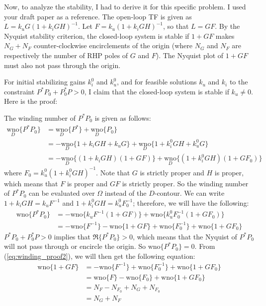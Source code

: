 \documentclass[12pt]{article}
\begin{document}
Now, to analyze the stability, I had to derive it for this specific problem. I used your draft paper as a reference. The open-loop TF is given as $L = k_uG(1+k_iGH)^{-1}$. Let $F = k_u(1+k_iGH)^{-1}$, so that $L = GF$. By the Nyquist stability criterion, the closed-loop system is stable if $1+GF$ makes $N_G+N_F$ counter-clockwise encirclements of the origin (where $N_G$ and $N_F$ are respectively the number of RHP poles of $G$ and $F$). The Nyquist plot of $1+GF$ must also not pass through the origin.

For initial stabilizing gains $k_i^0$ and $k_u^0$, and for feasible solutions $k_u$ and $k_i$ to the constraint $P^*P_0+P_0^*P > 0$, I claim that the closed-loop system is stable if $k_u \neq 0$. Here is the proof:

The winding number of $P^*P_0$ is given as follows:
\begin{equation} \label{eq:winding_proof}
\begin{aligned}
\underset{D}{\mbox{wno}} \{ P^*P_0\} &= \underset{D}{\mbox{wno}} \{ P^*\} + \underset{D}{\mbox{wno}} \{ P_0\} \\
&= -\underset{D}{\mbox{wno}} \{ 1+k_iGH+k_uG\} + \underset{D}{\mbox{wno}} \{ 1+k_i^0GH+k_u^0G\} \\
&=-\underset{D}{\mbox{wno}} \{ (1+k_iGH)(1+GF)\} + \underset{D}{\mbox{wno}} \{ (1+k_i^0GH)(1+GF_0)\}
\end{aligned}
\end{equation}
where $F_0 = k_u^0(1+k_i^0GH)^{-1}$. Note that $G$ is strictly proper and $H$ is proper, which means that $F$ is proper and $GF$ is strictly proper. So the winding number of $P^*P_0$ can be evaluated over $\Omega$ instead of the $D$-contour. We can write $1+k_iGH = k_uF^{-1}$ and $1+k_i^0GH = k_u^0F_0^{-1}$; therefore, we will have the following:
\begin{equation} \label{eq:winding_proof2}
\begin{aligned}
\mbox{wno} \{ P^*P_0\} &= -\mbox{wno} \{ k_uF^{-1}(1+GF)\} + \mbox{wno} \{ k_u^0F_0^{-1}(1+GF_0)\} \\
&= -\mbox{wno} \{F^{-1}\} - \mbox{wno} \{1+GF\} +\mbox{wno} \{F_0^{-1}\} + \mbox{wno} \{1+GF_0\} 
\end{aligned}
\end{equation}
$P^*P_0+P_0^*P > 0$ implies that $\Re\{ P^*P_0\} > 0$, which means that the Nyquist of $P^*P_0$ will not pass through or encircle the origin. So $\mbox{wno} \{ P^*P_0\} = 0$. From (\ref{eq:winding_proof2}), we will then get the following equation:
\begin{equation} \label{eq:winding_proof3}
\begin{aligned}
\mbox{wno} \{ 1+GF\} &= -\mbox{wno} \{ F^{-1}\} + \mbox{wno} \{ F_0^{-1}\} + \mbox{wno} \{ 1+GF_0\}\\
&= \mbox{wno} \{ F\} - \mbox{wno} \{ F_0\} + \mbox{wno} \{ 1+GF_0\} \\
&= N_F - N_{F_0} + N_G + N_{F_0} \\
&= N_G+N_F
\end{aligned}
\end{equation}
\end{document}
